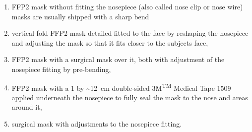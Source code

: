 \documentclass[preprint]{elsarticle}
\begin{document}
\begin{enumerate}[label=(\roman*),topsep=-1ex,itemsep=-1ex,partopsep=1ex,parsep=1ex]
\item FFP2 mask without fitting the nosepiece (also called nose clip or nose wire) masks are usually shipped with a sharp bend
\item vertical-fold FFP2 mask detailed fitted to the face by reshaping the nosepiece and
adjusting the mask so that it fits closer to the subjects face,
\item FFP2 mask with a surgical mask over it, both with adjustment of the nosepiece fitting by pre-bending,
\item FFP2 mask with a 1 by \SI{~12}{\centi\meter} double-sided 3M\textsuperscript{TM} Medical Tape 1509 applied underneath the nosepiece to fully seal the mask to the nose and areas around it,
\item surgical mask with adjustments to the nosepiece fitting.
\end{enumerate}
\end{document}

